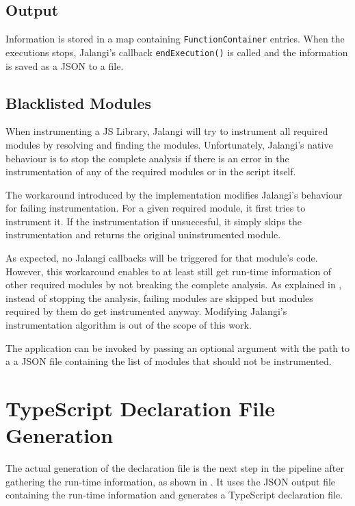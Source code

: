 \subsection{Output}
Information is stored in a map containing \texttt{FunctionContainer} entries. When the executions stops, Jalangi's callback \texttt{endExecution()} is called and the information is saved as a JSON to a file.


\subsection{Blacklisted Modules}
When instrumenting a JS Library, Jalangi will try to instrument all required modules by resolving and finding the modules. Unfortunately, Jalangi's native behaviour is to stop the complete analysis if there is an error in the instrumentation of any of the required modules or in the script itself.

The workaround introduced by the implementation modifies Jalangi's behaviour for failing instrumentation. For a given required module, it first tries to instrument it. If the instrumentation if unsuccesful, it simply skips the instrumentation and returns the original uninstrumented module.

As expected, no Jalangi callbacks will be triggered for that module's code. However, this workaround enables to at least still get run-time information of other required modules by not breaking the complete analysis. As explained in , instead of stopping the analysis, failing modules are skipped but modules required by them do get instrumented anyway. Modifying Jalangi's instrumentation algorithm is out of the scope of this work.

The application can be invoked by passing an optional argument with the path to a a JSON file containing the list of modules that should not be instrumented.



\section{TypeScript Declaration File Generation}
The actual generation of the declaration file is the next step in the pipeline after gathering the run-time information, as shown in . It uses the JSON output file containing the run-time information and generates a TypeScript declaration file.

